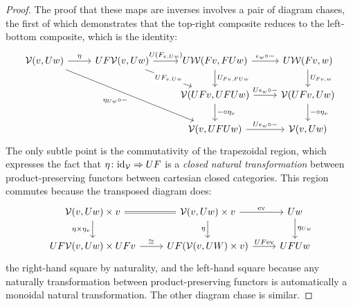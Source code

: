\begin{proof}
The proof that these maps are inverses involves a pair of diagram chases, the first of which demonstrates that the top-right composite reduces to the left-bottom composite, which is the identity:
\[
\begin{tikzcd}
\cV(v,Uw) \arrow[r, "\eta"] \arrow[ddrr, "\eta_{Uw}\circ-"'] & UF\cV(v,Uw) \arrow[r, "U(F_{v,Uw})"] \arrow[dr, "UF_{v, Uw}" description] & U\cW(Fv,FUw) \arrow[r, "\epsilon_w \circ -"] \arrow[d, "U_{Fv,FUw}"] & U\cW(Fv,w) \arrow[d, "U_{Fv,w}"] \\ & & \cV(UFv,UFUw) \arrow[r, "U\epsilon_w \circ -"]  \arrow[d, "-\circ \eta_v"]& \cV(UFv,Uw) \arrow[d, "-\circ \eta_v"] \\ & & \cV(v,UFUw) \arrow[r, "U\epsilon_w\circ-"] & \cV(v,Uw)
\end{tikzcd}
\]
The only subtle point is the commutativity of the trapezoidal region, which expresses the fact that $\eta \colon \textup{id}_{\mathord{\mathcal{V}}} \Rightarrow UF$ is a \emph{closed natural transformation} between product-preserving functors between cartesian closed categories. This region commutes because the transposed diagram does:
\[
\begin{tikzcd} \cV(v,Uw) \times v\arrow[d, "\eta \times \eta_v"'] \arrow[r, equals] &  \cV(v,Uw) \times v \arrow[d, "\eta"']  \arrow[r, "\ev"] & Uw \arrow[d, "\eta_{Uw}"] \\  UF\cV(v,Uw)\times UFv  \arrow[r, "\cong"] & UF(\cV(v,UW)\times v) \arrow[r, "UF\ev"] & UFUw
\end{tikzcd}
\]
the right-hand square by naturality, and the left-hand square because any naturally transformation between product-preserving functors is automatically a monoidal natural transformation. %
  The other diagram chase is similar.
\end{proof}

